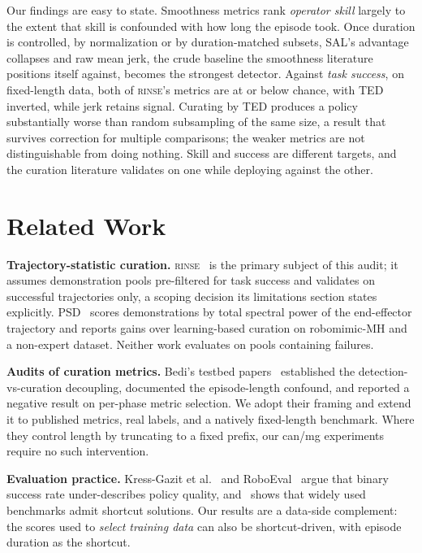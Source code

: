 \documentclass[10pt]{article}
\newcommand{\rinse}{\textsc{rinse}}
\begin{document}
Our findings are easy to state. Smoothness metrics rank \emph{operator
skill} largely to the extent that skill is confounded with how long the
episode took. Once duration is controlled, by normalization or by
duration-matched subsets, SAL's advantage collapses and raw mean jerk, the
crude baseline the smoothness literature positions itself against, becomes
the strongest detector. Against \emph{task success}, on fixed-length data,
both of \rinse{}'s metrics are at or below chance, with TED inverted, while
jerk retains signal. Curating by TED produces a policy substantially worse
than random subsampling of the same size, a result that survives correction
for multiple comparisons; the weaker metrics are not distinguishable from
doing nothing. Skill and success are
different targets, and the curation literature validates on one while
deploying against the other.

\section{Related Work}

\textbf{Trajectory-statistic curation.} \rinse{}~\citep{rinse} is the primary
subject of this audit; it assumes demonstration pools pre-filtered for task
success and validates on successful trajectories only, a scoping decision its
limitations section states explicitly. PSD~\citep{psd} scores demonstrations
by total spectral power of the end-effector trajectory and reports gains over
learning-based curation on robomimic-MH and a non-expert dataset. Neither
work evaluates on pools containing failures.

\textbf{Audits of curation metrics.} Bedi's testbed
papers~\citep{bedi-audit,bedi-policy,bedi-phase} established the
detection-vs-curation decoupling, documented the episode-length confound, and
reported a negative result on per-phase metric selection. We adopt their
framing and extend it to published metrics, real labels, and a natively
fixed-length benchmark. Where they control length by truncating to a fixed
prefix, our can/mg experiments require no such intervention.

\textbf{Evaluation practice.} Kress-Gazit et
al.~\citep{empirical-science} and RoboEval~\citep{roboeval} argue that binary
success rate under-describes policy quality, and~\citep{benchmarking-audit}
shows that widely used benchmarks admit shortcut solutions. Our results are a
data-side complement: the scores used to \emph{select training data} can also
be shortcut-driven, with episode duration as the shortcut.
\end{document}
